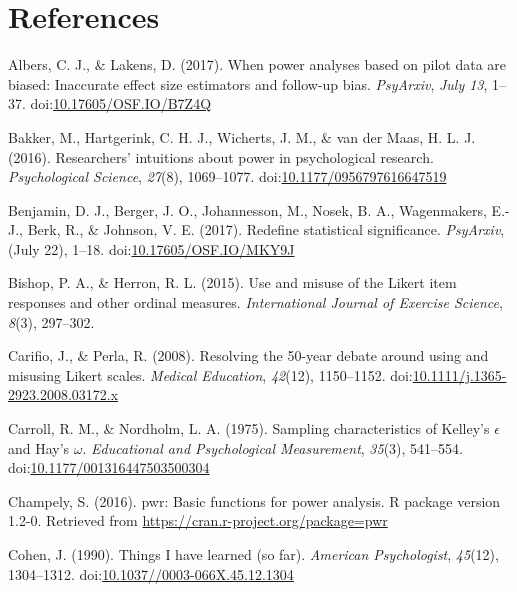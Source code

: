 \documentclass[english,man]{apa6}
\theoremstyle{definition}
\theoremstyle{definition}
\theoremstyle{definition}
\theoremstyle{remark}
\begin{document}
\newpage

\section{References}\label{references}

\setlength{\parindent}{-0.5in} \setlength{\leftskip}{0.5in}

\hypertarget{refs}{}
\hypertarget{ref-Albers2017}{}
Albers, C. J., \& Lakens, D. (2017). When power analyses based on pilot
data are biased: Inaccurate effect size estimators and follow-up bias.
\emph{PsyArxiv}, \emph{July 13}, 1--37.
doi:\href{https://doi.org/10.17605/OSF.IO/B7Z4Q}{10.17605/OSF.IO/B7Z4Q}

\hypertarget{ref-Bakker2016}{}
Bakker, M., Hartgerink, C. H. J., Wicherts, J. M., \& van der Maas, H.
L. J. (2016). Researchers' intuitions about power in psychological
research. \emph{Psychological Science}, \emph{27}(8), 1069--1077.
doi:\href{https://doi.org/10.1177/0956797616647519}{10.1177/0956797616647519}

\hypertarget{ref-Benjamin2017}{}
Benjamin, D. J., Berger, J. O., Johannesson, M., Nosek, B. A.,
Wagenmakers, E.-J., Berk, R., \& Johnson, V. E. (2017). Redefine
statistical significance. \emph{PsyArxiv}, (July 22), 1--18.
doi:\href{https://doi.org/10.17605/OSF.IO/MKY9J}{10.17605/OSF.IO/MKY9J}

\hypertarget{ref-Bishop2015}{}
Bishop, P. A., \& Herron, R. L. (2015). Use and misuse of the Likert
item responses and other ordinal measures. \emph{International Journal
of Exercise Science}, \emph{8}(3), 297--302.

\hypertarget{ref-Carifio2008}{}
Carifio, J., \& Perla, R. (2008). Resolving the 50-year debate around
using and misusing Likert scales. \emph{Medical Education},
\emph{42}(12), 1150--1152.
doi:\href{https://doi.org/10.1111/j.1365-2923.2008.03172.x}{10.1111/j.1365-2923.2008.03172.x}

\hypertarget{ref-Carroll1975}{}
Carroll, R. M., \& Nordholm, L. A. (1975). Sampling characteristics of
Kelley's \(\epsilon\) and Hay's \(\omega\). \emph{Educational and
Psychological Measurement}, \emph{35}(3), 541--554.
doi:\href{https://doi.org/10.1177/001316447503500304}{10.1177/001316447503500304}

\hypertarget{ref-Champely2016}{}
Champely, S. (2016). pwr: Basic functions for power analysis. R package
version 1.2-0. Retrieved from
\url{https://cran.r-project.org/package=pwr}

\hypertarget{ref-Cohen1990}{}
Cohen, J. (1990). Things I have learned (so far). \emph{American
Psychologist}, \emph{45}(12), 1304--1312.
doi:\href{https://doi.org/10.1037//0003-066X.45.12.1304}{10.1037//0003-066X.45.12.1304}
\end{document}
